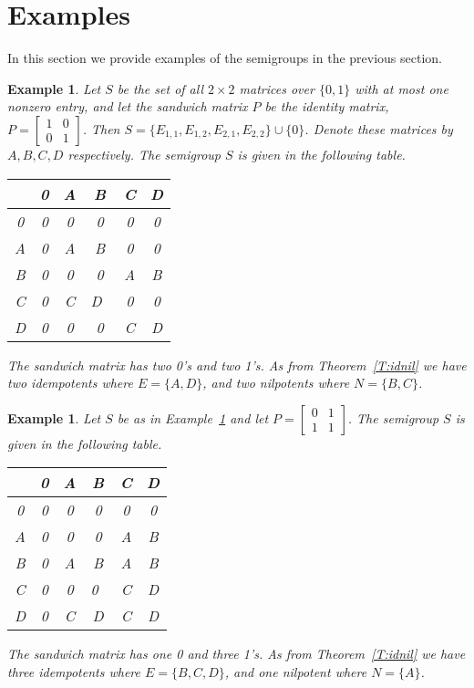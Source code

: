 \documentclass[12pt]{amsart}
\theoremstyle{plain}
\newtheorem{example}[theorem]{Example}
\theoremstyle{definition}
\begin{document}


\section {Examples}

In this section we provide examples of the semigroups in the previous section. 

\begin {example} \label{E:Id}
\emph{Let $S$ be the set of all $2 \times 2$ matrices over $\{0, 1\} $ with at most one nonzero entry, and let the sandwich matrix $P$ be the identity matrix, $P= \begin {bmatrix} 1 &0 \\0 &1 \end {bmatrix}$. Then $S = \{E_{1,1}, E_{1,2}, E_{2,1}, E_{2,2}\} \cup \{0\}$. Denote these matrices by $A, B, C, D$ respectively. The semigroup $S$ is given in the following table. }

\begin {center}
\begin {tabular} {c| c c c c c }
$\ $ &0&A &B &C &D\\
\hline
0 &0 &0 &0 &0 &0\\
A &0 &A &B &0 &0\\
B &0 &0 &0 &A &B\\
C &0 &C &D\ &0 &0\\
D &0 &0 &0 &C &D
\end {tabular}
\end {center}

\noindent \emph{The sandwich matrix has two 0's and two 1's. As from Theorem~\ref{T:idnil} we have two idempotents where $E = \{A, D\}$, and two nilpotents where $N = \{B, C\}$}.

\end {example}


\begin {example}

\emph{Let $S$ be as in Example~\ref{E:Id} and let $P= \begin {bmatrix} 0 &1 \\1 &1 \end {bmatrix}$. The semigroup $S$ is given in the following table.}

\begin {center}
\begin {tabular} {c| c c c c c}
$\ $ &0 &A &B &C &D\\
\hline
0 &0 &0 &0 &0 &0\\
A &0 &0 &0 &A &B\\
B &0 &A &B &A &B\\
C &0 &0 &0\ &C &D\\
D &0 &C &D &C &D
\end {tabular}
\end {center}

\noindent \emph{The sandwich matrix has one 0 and three 1's. As from Theorem~\ref{T:idnil} we have three idempotents where $E = \{B, C, D\}$, and one nilpotent where $N = \{A\}$}.
\end {example}
\end{document}
